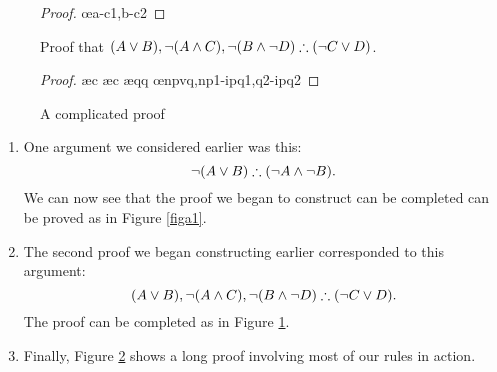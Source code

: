 \begin{figure}
	\begin{proof}
	\open{}
	\open{}
\open {}
\open {}
\close
{}
\close
\open {}
\open{}
\close
{}
	\oe{a-c1,b-c2}
\end{proof}
\caption{Proof that $(A\vee B), \neg (A\wedge C), \neg (B \wedge \neg D) \mathrel{\therefore} (\neg C\vee D)$.\label{figa2}}
\end{figure}

 \begin{figure}
	\begin{proof}
	\open
		\open
			\open
				\open
				\ae{c}
				\ae{c}
				\close
			\close
		\close
		\open
			\open
			\ae{qq}
			\close
		\close
		\oe{npvq,np1-ipq1,q2-ipq2}
		\close
		\open
			\open
				\open
				\close
			\close
		\close
\end{proof}\caption{A complicated proof\label{fig:vi}}
\end{figure}

\begin{enumerate}
	\item One argument we considered earlier was this: $$\neg (A \vee B) \mathrel{\therefore} (\neg A \wedge \neg B).$$ We can now see that the proof we began to construct can be completed can be proved as in Figure \ref{figa1}.
	\item The second proof we began constructing earlier corresponded to this argument: $$(A\vee B), \neg (A\wedge C), \neg (B \wedge \neg D) \mathrel{\therefore} (\neg C\vee D).$$ The proof can be completed as in Figure \ref{figa2}.
	\item Finally, Figure \ref{fig:vi} shows a long proof involving most of our rules in action. 
\end{enumerate}

